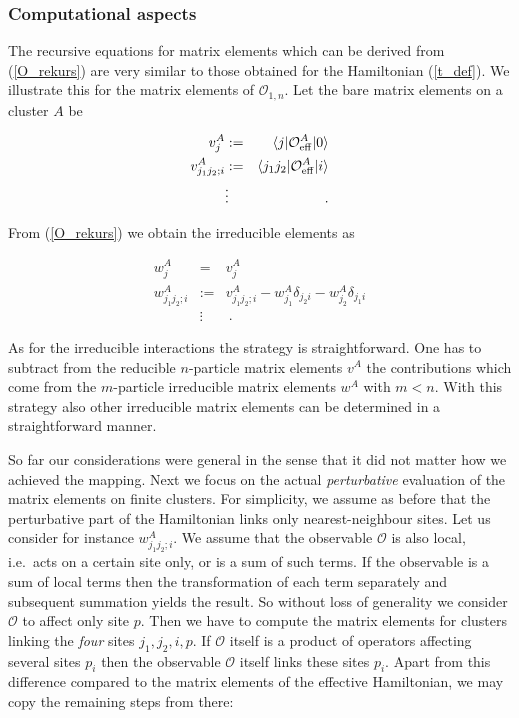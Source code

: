 \subsubsection{Computational aspects}
The recursive equations for matrix elements which can be derived
from (\ref{O_rekurs}) are very similar to those obtained
for the Hamiltonian (\ref{t_def}). We illustrate this for
the matrix elements of ${\mathcal O}_{1,n}$. Let the bare
matrix elements on a cluster $A$ be
\begin{mathletters}
\label{v_def}
\begin{eqnarray}
  v^A_j &:=&\langle j|{\mathcal O}_{\rm eff}^A|0\rangle\\
  v^A_{j_1j_2;i} &:=&\langle j_1j_2|{\mathcal O}_{\rm eff}^A|i\rangle\\
\nonumber & \vdots &\ .
\end{eqnarray}
\end{mathletters}
From (\ref{O_rekurs}) we obtain the irreducible elements as
\begin{mathletters}
\label{w_def}
\begin{eqnarray}
  w_j^A &= &v_j^A\\
 w^A_{j_1j_2;i} &:=&v^A_{j_1j_2;i}-w_{j_1}^A \delta_{j_2i}
-w_{j_2}^A \delta_{j_1i}\\
\nonumber & \vdots &\ .
\end{eqnarray}
\end{mathletters}
As for the irreducible interactions the strategy is straightforward. 
One has to subtract from the reducible $n$-particle  matrix elements $v^A$
the contributions which come from the $m$-particle irreducible
 matrix elements $w^A$ with $m<n$.
With this strategy also other irreducible
matrix elements can be determined in a straightforward manner.


So far our considerations were general in the sense that it did not
matter how we achieved the mapping.
Next we focus on the actual {\it perturbative}
 evaluation of the matrix elements on
finite clusters. For simplicity, we assume as before that the 
perturbative part of the Hamiltonian links only nearest-neighbour
sites. Let us consider for instance $w^A_{j_1j_2;i}$. We assume that
the observable ${\mathcal O}$ is also local, i.e.\ acts on 
a certain site only, or is a sum of such terms. If the observable is
 a sum of local terms then the transformation of each term separately
and subsequent summation yields the result. So without loss of generality
we consider ${\mathcal O}$ to affect only site $p$. Then we have to compute the
matrix elements for clusters linking the {\it four} sites $j_1,j_2,i,p$.
If ${\mathcal O}$ itself is a product of operators affecting several
sites $p_i$ then the observable ${\mathcal O}$ itself links these sites
$p_i$. Apart from this difference compared to the matrix elements of
the effective Hamiltonian,
we may copy the remaining steps from there:

